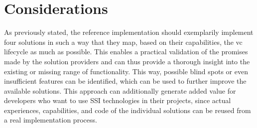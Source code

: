     \section{Considerations}\label{section: ri-considerations}
    As previously stated, the reference implementation should exemplarily implement four solutions in such a way that they map, based on their capabilities, the \ac{vc} lifecycle as much as possible. This enables a practical validation of the promises made by the solution providers and can thus provide a thorough insight into the existing or missing range of functionality. This way, possible blind spots or even insufficient features can be identified, which can be used to further improve the available solutions. This approach can additionally generate added value for developers who want to use \ac{SSI} technologies in their projects, since actual experiences, capabilities, and code of the individual solutions can be reused from a real implementation process.
    
